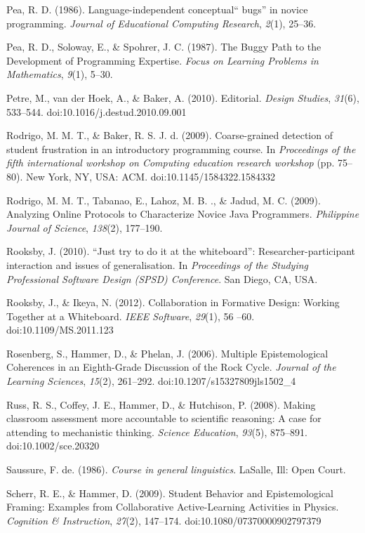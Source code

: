 Pea, R. D. (1986). Language-independent conceptual`` bugs'' in novice
programming. \emph{Journal of Educational Computing Research},
\emph{2}(1), 25--36.

Pea, R. D., Soloway, E., \& Spohrer, J. C. (1987). The Buggy Path to the
Development of Programming Expertise. \emph{Focus on Learning Problems
in Mathematics}, \emph{9}(1), 5--30.

Petre, M., van der Hoek, A., \& Baker, A. (2010). Editorial.
\emph{Design Studies}, \emph{31}(6), 533--544.
doi:10.1016/j.destud.2010.09.001

Rodrigo, M. M. T., \& Baker, R. S. J. d. (2009). Coarse-grained
detection of student frustration in an introductory programming course.
In \emph{Proceedings of the fifth international workshop on Computing
education research workshop} (pp. 75--80). New York, NY, USA: ACM.
doi:10.1145/1584322.1584332

Rodrigo, M. M. T., Tabanao, E., Lahoz, M. B. ., \& Jadud, M. C. (2009).
Analyzing Online Protocols to Characterize Novice Java Programmers.
\emph{Philippine Journal of Science}, \emph{138}(2), 177--190.

Rooksby, J. (2010). ``Just try to do it at the whiteboard'':
Researcher-participant interaction and issues of generalisation. In
\emph{Proceedings of the Studying Professional Software Design (SPSD)
Conference}. San Diego, CA, USA.

Rooksby, J., \& Ikeya, N. (2012). Collaboration in Formative Design:
Working Together at a Whiteboard. \emph{IEEE Software}, \emph{29}(1), 56
--60. doi:10.1109/MS.2011.123

Rosenberg, S., Hammer, D., \& Phelan, J. (2006). Multiple
Epistemological Coherences in an Eighth-Grade Discussion of the Rock
Cycle. \emph{Journal of the Learning Sciences}, \emph{15}(2), 261--292.
doi:10.1207/s15327809jls1502\_4

Russ, R. S., Coffey, J. E., Hammer, D., \& Hutchison, P. (2008). Making
classroom assessment more accountable to scientific reasoning: A case
for attending to mechanistic thinking. \emph{Science Education},
\emph{93}(5), 875--891. doi:10.1002/sce.20320

Saussure, F. de. (1986). \emph{Course in general linguistics}. LaSalle,
Ill: Open Court.

Scherr, R. E., \& Hammer, D. (2009). Student Behavior and
Epistemological Framing: Examples from Collaborative Active-Learning
Activities in Physics. \emph{Cognition \& Instruction}, \emph{27}(2),
147--174. doi:10.1080/07370000902797379

